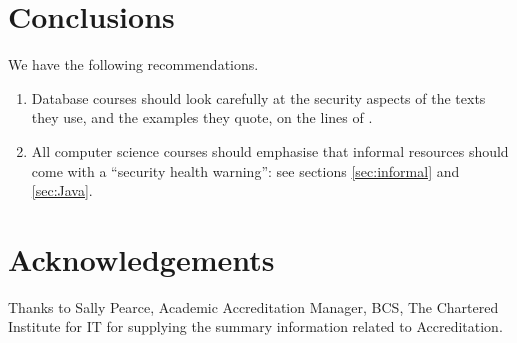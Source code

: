 \documentclass[sigconf,anonymous]{acmart}
\begin{document}
\section{Conclusions}

We have the following recommendations.
\begin{enumerate}
\item Database courses should look carefully at the security aspects of the texts they use, and the examples they quote, on the lines of \cite{Drop2019}.
\item All computer science courses should emphasise that informal resources should come with a ``security health warning'': see sections \ref{sec:informal} and \ref{sec:Java}.
\end{enumerate}

\section*{Acknowledgements}
Thanks to Sally Pearce, Academic Accreditation Manager, BCS, The Chartered Institute for IT for supplying the summary information related to Accreditation.


 
\end{document}
